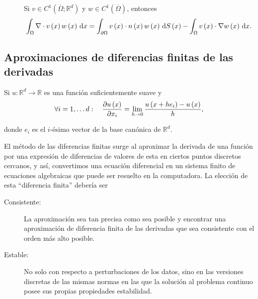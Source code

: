 \begin{theorem}
\begin{description}
        \item[]

            Si $v\in C^{1}\left(\overline{\Omega};\mathbb{R}^{d}\right)$ y
            $w\in C^{1}\left(\overline{\Omega}\right)$, entonces
            \begin{equation*}
                \int_{\Omega}\nabla\cdot v\left(x\right)
                w\left(x\right)
                \dl x=
                \int_{\partial\Omega}
                v\left(x\right)\cdot
                n\left(x\right)
                w\left(x\right)
                \dl{S\left(x\right)}-
                \int_{\Omega}
                v\left(x\right)\cdot
                \nabla w\left(x\right)
                \dl x.
            \end{equation*}
    \end{description}
\end{theorem}

\subsection{Aproximaciones de diferencias finitas de las derivadas}

Si $u\colon\mathbb{R}^d\to\mathbb{R}$ es una función suficientemente
suave y
\begin{equation*}
    \forall i=1,\dotsc d:\quad
    \diffp{u\left(x\right)}{x_{i}}=
    \lim\limits_{h\to0}
    \dfrac{
        u\left(x+he_{i}\right)-
        u\left(x\right)}{h},
\end{equation*}

donde $e_{i}$ es el $i$-ésimo vector de la base canónica de
$\mathbb{R}^d$.

El método de las diferencias finitas surge al aproximar la derivada
de una función por una expresión de diferencias de valores de esta en
ciertos puntos discretos cercanos, y así, convertimos una ecuación
diferencial en un sistema finito de ecuaciones algebraicas que puede
ser resuelto en la computadora.
La elección de esta ``diferencia finita'' debería ser

\begin{description}
    \item[Consistente:]

        La aproximación sea tan precisa como sea posible y encontrar
        una aproximación de diferencia finita de las derivadas que
        sea consistente con el orden más alto posible.

    \item[Estable:]

        No solo con respecto a perturbaciones de los datos, sino
        en las versiones discretas de las mismas normas en las que la
        solución al problema continuo posee sus propias propiedades
        estabilidad.
\end{description}

